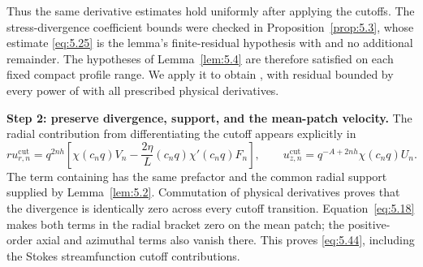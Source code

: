 %
Thus the same derivative estimates hold uniformly after applying the cutoffs. The stress-divergence coefficient bounds were checked in Proposition~\ref{prop:5.3}, whose estimate \eqref{eq:5.25} is the lemma's finite-residual hypothesis with  and no additional remainder. The hypotheses of Lemma~\ref{lem:5.4} are therefore satisfied on each fixed compact profile range. We apply it to obtain , with residual  bounded by every power of  with all prescribed physical derivatives.

\textbf{Step 2: preserve divergence, support, and the mean-patch velocity.} The radial contribution from differentiating the cutoff appears explicitly in
\begin{equation}
 r u^{\mathrm{cut}}_{r,n}
 =q^{2nh}\left[\chi(c_nq)V_n-\frac{2\eta}{L}(c_nq)\chi'(c_nq)F_n\right],
 \qquad
 u^{\mathrm{cut}}_{z,n}=q^{-A+2nh}\chi(c_nq)U_n.
 \tag{5.45}\label{eq:5.45}
\end{equation}
The term containing  has the same  prefactor and the common radial support supplied by Lemma~\ref{lem:5.2}. Commutation of physical derivatives proves that the divergence is identically zero across every cutoff transition. Equation~\eqref{eq:5.18} makes both terms in the radial bracket zero on the mean patch; the positive-order axial and azimuthal terms also vanish there. This proves \eqref{eq:5.44}, including the Stokes streamfunction cutoff contributions.

